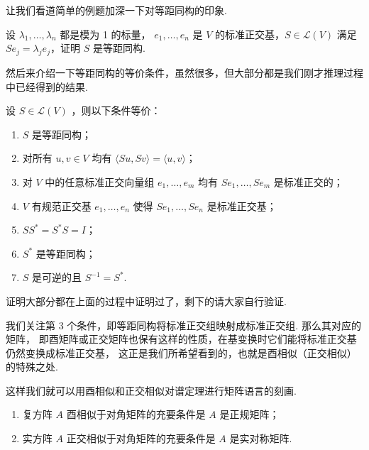 让我们看道简单的例题加深一下对等距同构的印象. 
\begin{example}
    设 $ \lambda_1, \ldots , \lambda_n $ 都是模为 1 的标量，
    $ e_1, \ldots , e_n $ 是 $ V $ 的标准正交基，$ S \in \mathcal{L}(V) $ 
    满足 $ Se_j = \lambda_je_j $，证明 $ S $ 是等距同构. 
\end{example}

然后来介绍一下等距同构的等价条件，虽然很多，但大部分都是我们刚才推理过程中已经得到的结果. 

\begin{theorem}
    设 $ S \in \mathcal{L}(V) $ ，则以下条件等价：
    \begin{enumerate}
        \item $ S $ 是等距同构；
        
        \item 对所有 $ u, v \in V $ 均有 $ \langle Su, Sv \rangle = \langle u, v \rangle $；
        
        \item 对 $ V $ 中的任意标准正交向量组 $ e_1, \ldots , e_m $ 均有 $ Se_1, \ldots , Se_m $ 是标准正交的；
        
        \item $ V $ 有规范正交基 $ e_1, \ldots ,e_n $ 使得 $ Se_1, \ldots , Se_n $ 是标准正交基；
        
        \item $ SS^* = S^*S = I $； 
        
        \item $ S^* $ 是等距同构；
        
        \item $ S $ 是可逆的且 $ S^{-1} = S^* $. 
    \end{enumerate}
\end{theorem}

证明大部分都在上面的过程中证明过了，剩下的请大家自行验证. 

我们关注第 3 个条件，即等距同构将标准正交组映射成标准正交组. 那么其对应的矩阵，
即酉矩阵或正交矩阵也保有这样的性质，在基变换时它们能将标准正交基仍然变换成标准正交基，
这正是我们所希望看到的，也就是酉相似（正交相似）的特殊之处.

这样我们就可以用酉相似和正交相似对谱定理进行矩阵语言的刻画. 

\begin{theorem}
    \begin{enumerate}
        \item 复方阵 $ A $ 酉相似于对角矩阵的充要条件是 $ A $ 是正规矩阵；
        
        \item 实方阵 $ A $ 正交相似于对角矩阵的充要条件是 $ A $ 是实对称矩阵. 
    \end{enumerate}
\end{theorem}

